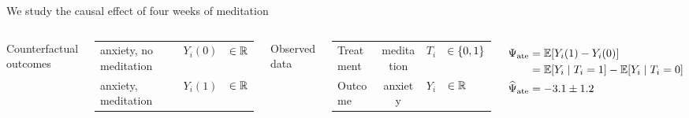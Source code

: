 \documentclass[aspectratio=169]{beamer}
\theoremstyle{remark}
\begin{document}
\begin{frame}{We study the causal effect of four weeks of meditation}

    \begin{columns}

        Counterfactual outcomes

        \begin{table}[]
            \begin{tabular}{lcl}
                anxiety, no meditation & $Y_i(0)$ & $\in \mathbb{R}$ \\
                anxiety, meditation    & $Y_i(1)$ & $\in \mathbb{R}$
            \end{tabular}
        \end{table}

        Observed data

        \begin{table}[]
            \begin{tabular}{lcrl}
                Treatment & meditation & $T_i$ & $\in \{0, 1\} $ \\
                Outcome   & anxiety    & $Y_i$ & $\in \mathbb{R}$
            \end{tabular}
        \end{table}
        \begin{align*}
            \ate    & = \E{Y_i (1) - Y_i (0)}                       \\
                    & = \E{Y_i \mid T_i = 1} - \E{Y_i \mid T_i = 0} \\
            \atehat & = -3.1 \pm 1.2
        \end{align*}


\end{columns}
\end{frame}
\end{document}
